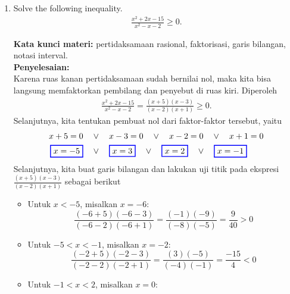 \documentclass[10pt,openany,a4paper]{article}
\theoremstyle{definition}
\theoremstyle{definition}
\theoremstyle{plain}
\newenvironment{jawab}[2][tes]{%
\par\noindent\textbf{Kata kunci materi:} #1.\\
\textbf{Penyelesaian:} #2%
}{}
\begin{document}
\newpage

\begin{enumerate}
    \item Solve the following inequality.
    \begin{align*}
        \frac{x^2+2x-15}{x^2-x-2}\geq 0.
    \end{align*}
    \begin{jawab}[pertidaksamaan rasional, faktorisasi, garis bilangan, notasi interval]{~\\
    Karena ruas kanan pertidaksamaan sudah bernilai nol, maka kita bisa langsung memfaktorkan pembilang dan penyebut di ruas kiri. Diperoleh
    \begin{align*}
        \frac{x^2+2x-15}{x^2-x-2} = \frac{(x+5)(x-3)}{(x-2)(x+1)} \geq 0.
    \end{align*}
    Selanjutnya, kita tentukan pembuat nol dari faktor-faktor tersebut, yaitu
    \begin{align*}
        x+5 = 0 \quad &\vee\quad x-3 = 0 \quad \vee\quad x-2 = 0 \quad \vee\quad x+1 = 0\\
        \colorlet{oldcolor}{.}
        \color{blue}
        \setlength{\fboxrule}{1pt} \boxed{\color{oldcolor}x=-5}\color{oldcolor} \quad &\vee\quad \colorlet{oldcolor}{.}
        \color{blue}
        \setlength{\fboxrule}{1pt} \boxed{\color{oldcolor}x=3}\color{oldcolor} \quad \vee\quad \colorlet{oldcolor}{.}
        \color{blue}
        \setlength{\fboxrule}{1pt} \boxed{\color{oldcolor}x=2}\color{oldcolor} \quad \vee\quad \colorlet{oldcolor}{.}
        \color{blue}
        \setlength{\fboxrule}{1pt} \boxed{\color{oldcolor}x=-1}\color{oldcolor}
    \end{align*}
    Selanjutnya, kita buat garis bilangan dan lakukan uji titik pada ekspresi \(\frac{(x+5)(x-3)}{(x-2)(x+1)}\) sebagai berikut
    \begin{itemize}
        \item Untuk \(x < -5\), misalkan \(x = -6\):
        \[
        \frac{(-6+5)(-6-3)}{(-6-2)(-6+1)} = \frac{(-1)(-9)}{(-8)(-5)} = \frac{9}{40} > 0
        \]
        \item Untuk \(-5 < x < -1\), misalkan \(x = -2\):
        \[
        \frac{(-2+5)(-2-3)}{(-2-2)(-2+1)} = \frac{(3)(-5)}{(-4)(-1)} = \frac{-15}{4} < 0
        \]
        \item Untuk \(-1 < x < 2\), misalkan \(x = 0\):

\end{itemize}}
\end{jawab}
\end{enumerate}
\end{document}
